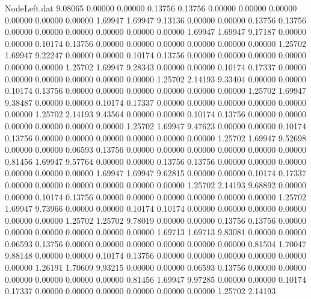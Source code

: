 \begin{filecontents}{NodeLeft.dat}
   9.08065    0.00000    0.00000     0.13756    0.13756    0.00000    0.00000    0.00000    0.00000    0.00000    0.00000    1.69947    1.69947
   9.13136    0.00000    0.00000     0.13756    0.13756    0.00000    0.00000    0.00000    0.00000    0.00000    0.00000    1.69947    1.69947
   9.17187    0.00000    0.00000     0.10174    0.13756    0.00000    0.00000    0.00000    0.00000    0.00000    0.00000    1.25702    1.69947
   9.22247    0.00000    0.00000     0.10174    0.13756    0.00000    0.00000    0.00000    0.00000    0.00000    0.00000    1.25702    1.69947
   9.28343    0.00000    0.00000     0.10174    0.17337    0.00000    0.00000    0.00000    0.00000    0.00000    0.00000    1.25702    2.14193
   9.33404    0.00000    0.00000     0.10174    0.13756    0.00000    0.00000    0.00000    0.00000    0.00000    0.00000    1.25702    1.69947
   9.38487    0.00000    0.00000     0.10174    0.17337    0.00000    0.00000    0.00000    0.00000    0.00000    0.00000    1.25702    2.14193
   9.43564    0.00000    0.00000     0.10174    0.13756    0.00000    0.00000    0.00000    0.00000    0.00000    0.00000    1.25702    1.69947
   9.47623    0.00000    0.00000     0.10174    0.13756    0.00000    0.00000    0.00000    0.00000    0.00000    0.00000    1.25702    1.69947
   9.52698    0.00000    0.00000     0.06593    0.13756    0.00000    0.00000    0.00000    0.00000    0.00000    0.00000    0.81456    1.69947
   9.57764    0.00000    0.00000     0.13756    0.13756    0.00000    0.00000    0.00000    0.00000    0.00000    0.00000    1.69947    1.69947
   9.62815    0.00000    0.00000     0.10174    0.17337    0.00000    0.00000    0.00000    0.00000    0.00000    0.00000    1.25702    2.14193
   9.68892    0.00000    0.00000     0.10174    0.13756    0.00000    0.00000    0.00000    0.00000    0.00000    0.00000    1.25702    1.69947
   9.73966    0.00000    0.00000     0.10174    0.10174    0.00000    0.00000    0.00000    0.00000    0.00000    0.00000    1.25702    1.25702
   9.78019    0.00000    0.00000     0.13756    0.13756    0.00000    0.00000    0.00000    0.00000    0.00000    0.00000    1.69713    1.69713
   9.83081    0.00000    0.00000     0.06593    0.13756    0.00000    0.00000    0.00000    0.00000    0.00000    0.00000    0.81504    1.70047
   9.88148    0.00000    0.00000     0.10174    0.13756    0.00000    0.00000    0.00000    0.00000    0.00000    0.00000    1.26191    1.70609
   9.93215    0.00000    0.00000     0.06593    0.13756    0.00000    0.00000    0.00000    0.00000    0.00000    0.00000    0.81456    1.69947
   9.97285    0.00000    0.00000     0.10174    0.17337    0.00000    0.00000    0.00000    0.00000    0.00000    0.00000    1.25702    2.14193

\end{filecontents}
